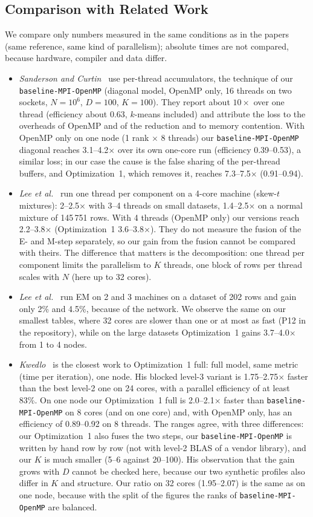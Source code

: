 \documentclass[conference,onecolumn]{IEEEtran}
\newcommand{\vbase}{\texttt{baseline-\allowbreak MPI-\allowbreak OpenMP}}
\begin{document}
\subsection{Comparison with Related Work}\label{sec:related-cmp}
We compare only numbers measured in the same conditions as in the papers (same reference, same kind of parallelism); absolute times are not compared, because hardware, compiler and data differ.
\begin{itemize}
\item \emph{Sanderson and Curtin~\cite{sanderson}} use per-thread accumulators, the technique of our \vbase{} (diagonal model, OpenMP only, 16 threads on two sockets, $N=10^6$, $D=100$, $K=100$). They report about $10\times$ over one thread (efficiency about 0.63, $k$-means included) and attribute the loss to the overheads of OpenMP and of the reduction and to memory contention. With OpenMP only on one node (1 rank $\times$ 8 threads) our \vbase{} diagonal reaches 3.1--4.2$\times$ over its own one-core run (efficiency 0.39--0.53), a similar loss; in our case the cause is the false sharing of the per-thread buffers, and Optimization~1, which removes it, reaches 7.3--7.5$\times$ (0.91--0.94).
\item \emph{Lee et al.~\cite{lee2016}} run one thread per component on a 4-core machine (skew-$t$ mixtures): 2--2.5$\times$ with 3--4 threads on small datasets, 1.4--2.5$\times$ on a normal mixture of 145\,751 rows. With 4 threads (OpenMP only) our versions reach 2.2--3.8$\times$ (Optimization~1 3.6--3.8$\times$). They do not measure the fusion of the E- and M-step separately, so our gain from the fusion cannot be compared with theirs. The difference that matters is the decomposition: one thread per component limits the parallelism to $K$ threads, one block of rows per thread scales with $N$ (here up to 32 cores).
\item \emph{Lee et al.~\cite{lee2020}} run EM on 2 and 3 machines on a dataset of 202 rows and gain only 2\% and 4.5\%, because of the network. We observe the same on our smallest tables, where 32 cores are slower than one or at most as fast (P12 in the repository), while on the large datasets Optimization~1 gains 3.7--4.0$\times$ from 1 to 4 nodes.
\item \emph{Kwedlo~\cite{kwedlo}} is the closest work to Optimization~1 full: full model, same metric (time per iteration), one node. His blocked level-3 variant is 1.75--2.75$\times$ faster than the best level-2 one on 24 cores, with a parallel efficiency of at least 83\%. On one node our Optimization~1 full is 2.0--2.1$\times$ faster than \vbase{} on 8 cores (and on one core) and, with OpenMP only, has an efficiency of 0.89--0.92 on 8 threads. The ranges agree, with three differences: our Optimization~1 also fuses the two steps, our \vbase{} is written by hand row by row (not with level-2 BLAS of a vendor library), and our $K$ is much smaller (5--6 against 20--100). His observation that the gain grows with $D$ cannot be checked here, because our two synthetic profiles also differ in $K$ and structure. Our ratio on 32 cores (1.95--2.07) is the same as on one node, because with the split of the figures the ranks of \vbase{} are balanced.
\end{itemize}
\end{document}
